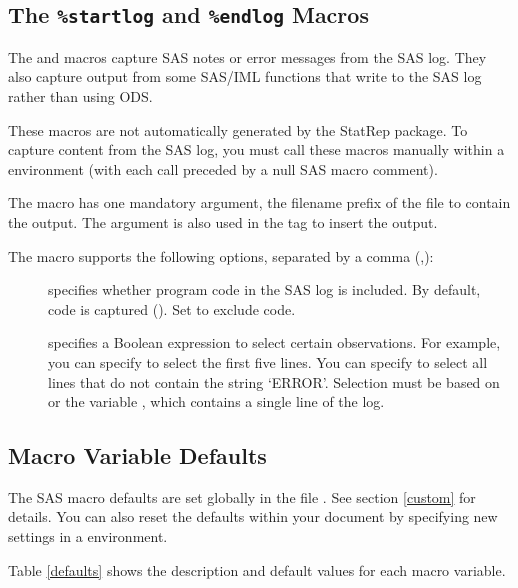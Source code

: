 \documentclass[article,oneside]{memoir}
\newcommand*{\StatRep}{\textsf{StatRep}\xspace}
\begin{document}
 \subsection{The \texttt{\%startlog} and \texttt{\%endlog} Macros}\label{startlog}

  The  and  macros capture SAS notes
  or error messages from the SAS log. They also capture output
  from some SAS/IML functions that write to the SAS log rather than using ODS.

  These macros are not automatically generated by the \StatRep package.
  To capture content from the SAS log, you must call these macros
  manually within a  environment (with each call preceded
  by a null SAS macro comment).

  The  macro has one mandatory argument, the filename prefix
  of the file to contain the output. The argument is also used in the 
  tag to insert the output.

  The  macro supports the following options,
  separated by a comma (,):

  \begin{description}
  \item[] specifies whether program code in the SAS log is included.
  By default, code is captured (). Set  to exclude code.
  \item[] specifies a Boolean expression to select
  certain observations. For example, you can specify 
  to select the first five lines.  You can specify
   to select all lines that do not contain the string
  `ERROR'. Selection must be based on  or the variable , which
  contains a single line of the log.
  \end{description}

  \subsection{Macro Variable Defaults}\label{secdefaults}

  The SAS macro defaults are set globally in the file .
  See section \ref{custom} for details. You can also reset the
  defaults within your document by specifying new settings in a 
  environment.

  Table \ref{defaults} shows the description and default values for each
  macro variable.
\end{document}
